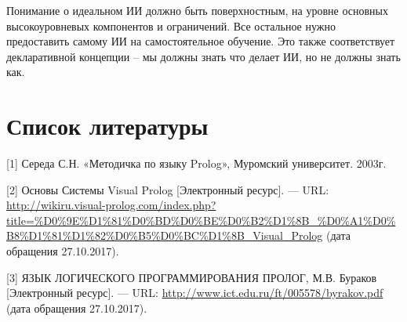 \documentclass[14pt,a4paper,report]{report}
\begin{document}
Понимание о идеальном ИИ должно быть поверхностным, на уровне основных высокоуровневых компонентов и ограничений. Все остальное нужно предоставить самому ИИ на самостоятельное обучение. Это также соответствует декларативной концепции -- мы должны знать что делает ИИ, но не должны знать как.

\section{Список литературы}


\begin{flushleft}
	
[1] Середа С.Н. «Методичка по языку Prolog», Муромский университет. 2003г.\linebreak

[2] Основы Системы Visual Prolog [Электронный ресурс]. — URL: \href{http://wikiru.visual-prolog.com/index.php?title=\%D0\%9E\%D1\%81\%D0\%BD\%D0\%BE\%D0\%B2\%D1\%8B\_\%D0\%A1\%D0\%B8\%D1\%81\%D1\%82\%D0\%B5\%D0\%BC\%D1\%8B_Visual_Prolog}{http://wikiru.visual-prolog.com/index.php?title=\%D0\%9E\%D1\%81\%D0\%BD\%D0\%BE\%D0\%B2\%D1\%8B\_\%D0\%A1\%D0\%B8\%D1\%81\%D1\%82\%D0\%B5\%D0\%BC\%D1\%8B\_Visual\_Prolog} (дата обращения 27.10.2017). \linebreak
	
[3] ЯЗЫК ЛОГИЧЕСКОГО ПРОГРАММИРОВАНИЯ ПРОЛОГ, М.В. Бураков [Электронный ресурс]. — URL: \href{http://www.ict.edu.ru/ft/005578/byrakov.pdf}{http://www.ict.edu.ru/ft/005578/byrakov.pdf} (дата обращения 27.10.2017). \linebreak





\end{flushleft}
	
\end{document}
